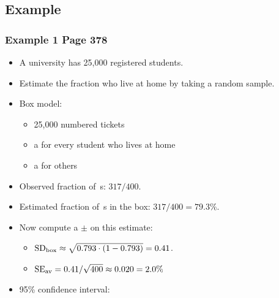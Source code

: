 \documentclass[t]{beamer}
\begin{document}
\subsection{Example}
\begin{frame}
\frametitle{Example 1 Page 378}

\footnotesize 
\begin{itemize}
\item A university has 25,000 registered students.  
\item<2-> Estimate the fraction who live at home by taking a random sample.
\item<3-> Box model: \vspace{-2pt}
   \begin{itemize}
   \item \scriptsize 25,000 numbered tickets
   \item \scriptsize a \vspace{1pt}
    for every student who lives at home
   \item \scriptsize a 
    for others 
   \end{itemize}
\item<4-> Observed fraction of \,s:  $317/400$.
\item<5-> Estimated fraction of \,s in the box:
   $317/400 = 79.3\%$.
\item<6-> Now compute a $\pm$ on this estimate:
    \begin{itemize}
    \item $\mbox{SD}_{\mbox{\scriptsize box}}\approx \sqrt{0.793\cdot (1-0.793)} = 0.41$.\vspace{2pt}
    \item $\mbox{SE}_{\mbox{\scriptsize av}} =0.41/\sqrt{400}\approx 0.020 = 2.0\%$
    \end{itemize}
\item<7-> 95\% confidence interval:\vspace{-3pt}
\end{itemize}
\label{lastpage}
\end{frame}
\end{document}
